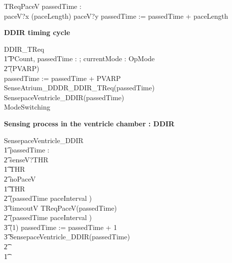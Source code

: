 \begin{circusaction}
	TReqPaceV \circdef \circvres passedTime : \nat \circspot \\
	paceV?x \then \circwait(paceLength) \circseq paceV?y \then passedTime := passedTime + paceLength 
\end{circusaction}




\textbf{DDIR timing cycle}

\begin{circusaction}
	DDIR\_TReq \circdef \\
  \t1 \circvres PCount, passedTime : \nat ; \circvres currentMode : OpMode \\
  \t2 \circspot 
  \circwait(PVARP) \circseq \\
   passedTime := passedTime + PVARP \circseq \\
   SenseAtrium\_DDDR\_DDIR\_TReq(passedTime) \circseq \\
   SensepaceVentricle\_DDIR(passedTime) \circseq \\
   ModeSwitching  
\end{circusaction}


\textbf {Sensing process in the ventricle chamber : DDIR}\\

\begin{circusaction}
SensepaceVentricle\_DDIR \circdef \\
\t1 \circvres passedTime : \nat \\
\t2 \circspot senseV?THR \then \\
\t1 \circif  THR  \circthen\\
\t2 noPaceV \then \Skip \\
\t1 \circelse \lnot  THR  \circthen\\
\t2 \circif  (passedTime \geq paceInterval ) \circthen \\
\t3 timeoutV \then TReqPaceV(passedTime)\\
\t2 \circelse \lnot (passedTime \geq paceInterval ) \circthen \\
\t3 \circwait(1) \circseq passedTime := passedTime + 1 \circseq \\
\t3 SensepaceVentricle\_DDIR(passedTime) \\
\t2 \circfi\\ 
\t1 \circfi \\ 
\end{circusaction}




